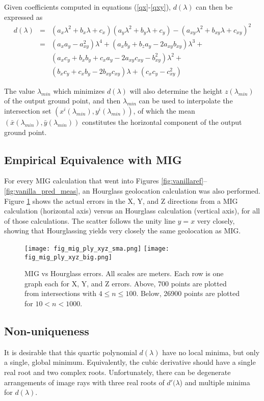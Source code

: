 \documentclass[10pt]{amsart}
\begin{document}
Given coefficients computed in equations (\ref{qx}-\ref{qxy}),
$d(\lambda)$ can then be expressed as
\begin{eqnarray}\label{d}
d(\lambda) &=& (a_x\lambda^2 + b_x\lambda + c_x)(a_y\lambda^2 + b_y\lambda + c_y) - 
(a_{xy}\lambda^2 + b_{xy}\lambda + c_{xy})^2 \nonumber \\
&=& (a_xa_y-a_{xy}^2)\lambda^4 + (a_xb_y+b_za_y-2a_{xy}b_{xy})\lambda^3 + \nonumber \\
&& (a_xc_y+b_xb_y+c_xa_y-2a_{xy}c_{xy}-b^2_{xy})\lambda^2 +\\
&& (b_xc_y+c_xb_y-2b_{xy}c_{xy})\lambda + (c_xc_y-c^2_{xy}) \nonumber
\end{eqnarray}

The value $\lambda_{min}$ which minimizes $d(\lambda)$ will also determine the
height $z(\lambda_{min})$ of the output ground point, and then $\lambda_{min}$
can be used to interpolate the intersection set
$(x^i(\lambda_{min}), y^i(\lambda_{min}))$, of which the mean
$(\bar{x}(\lambda_{min}), \bar{y}(\lambda_{min}))$ constitutes the horizontal
component of the output ground point.

\subsection{Empirical Equivalence with MIG}
For every MIG calculation that went into Figures
\ref{fig:vanillaref}--\ref{fig:vanilla_pred_meas}, an Hourglass geolocation
calculation was also performed. Figure \ref{fig:mig_vs_hourglass} shows the
actual errors in the X, Y, and Z directions from a MIG calculation (horizontal
axis) versus an Hourglass calculation (vertical axis), for all of those
calculations. The scatter follows the unity line $y=x$ very closely, showing
that Hourglassing yields very closely the same geolocation as MIG.

\begin{figure}
\texttt{[image: fig\_mig\_ply\_xyz\_sma.png]}
\texttt{[image: fig\_mig\_ply\_xyz\_big.png]}
\caption{\label{fig:mig_vs_hourglass}MIG vs Hourglass errors. All scales are
  meters. Each row is one graph each for X, Y, and Z errors. Above, 700 points
  are plotted from intersections with $4\le n\le 100$. Below, 26900 points are
  plotted for $10<n<1000$.}
\end{figure}


\subsection{Non-uniqueness}
It is desirable that this quartic polynomial $d(\lambda)$ have no
local minima, but only a single, global minimum. Equivalently, the
cubic derivative should have a single real root and two complex
roots. Unfortunately, there can be degenerate arrangements of image
rays with three real roots of $d'(\lambda$) and multiple minima for
$d(\lambda)$.
\end{document}
